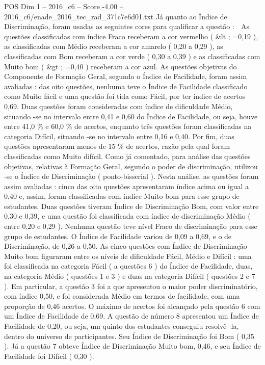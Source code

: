 \begin{textsample}{POS Dim 1 – 2016\_c6 – Score -4.00 – 2016\_c6/enade\_2016\_tec\_rad\_371c7e6d01.txt}
Já quanto ao Índice de Discriminação, foram usadas as seguintes cores para qualificar a questão :  As questões classificadas com índice Fraco receberam a cor vermelho ( \&lt ; =0,19 ), as classificadas com Médio receberam a cor amarelo ( 0,20 a 0,29 ), as classificadas com Bom receberam a cor verde ( 0,30 a 0,39 ) e as classificadas com Muito bom ( \&gt ; =0,40 ) receberam a cor azul.
As questões objetivas do Componente de Formação Geral, segundo o Índice de Facilidade, foram assim avaliadas : das oito questões, nenhuma teve o Índice de Facilidade classificado como Muito fácil e uma questão foi tida como Fácil, por ter índice de acertos 0,69.
Duas questões foram consideradas com índice de dificuldade Médio, situando -se no intervalo entre 0,41 e 0,60 do Índice de Facilidade, ou seja, houve entre 41,0 \% e 60,0 \% de acertos, enquanto três questões foram classificadas na categoria Difícil, situando -se no intervalo entre 0,16 e 0,40.
Por fim, duas questões apresentaram menos de 15 \% de acertos, razão pela qual foram classificadas como Muito difícil.
Como já comentado, para análise das questões objetivas, relativas à Formação Geral, segundo o poder de discriminação, utilizou -se o Índice de Discriminação ( ponto-bisserial ).
Nesta análise, as questões foram assim avaliadas : cinco das oito questões apresentaram índice acima ou igual a 0,40 e, assim, foram classificadas com índice Muito bom para esse grupo de estudantes.
Duas questões tiveram Índice de Discriminação Bom, com valor entre 0,30 e 0,39, e uma questão foi classificada com índice de discriminação Médio ( entre 0,20 e 0,29 ).
Nenhuma questão teve nível Fraco de discriminação para esse grupo de estudantes.
O Índice de Facilidade variou de 0,09 a 0,69, e o de Discriminação, de 0,26 a 0,50.
As cinco questões com Índice de Discriminação Muito bom figuraram entre os níveis de dificuldade Fácil, Médio e Difícil : uma foi classificada na categoria Fácil ( a questões 6 ) do Índice de Facilidade, duas, na categoria Médio ( questões 1 e 3 ) e duas na categoria Difícil ( questões 2 e 7 ).
Em particular, a questão 3 foi a que apresentou o maior poder discriminatório, com índice 0,50, e foi considerada Médio em termos de facilidade, com uma proporção de 0,46 acertos.
O máximo de acertos foi alcançado pela questão 6 com um Índice de Facilidade de 0,69.
A questão de número 8 apresentou um Índice de Facilidade de 0,20, ou seja, um quinto dos estudantes conseguiu resolvê -la, dentro do universo de participantes.
Seu Índice de Discriminação foi Bom ( 0,35 ).
Já a questão 7 obteve Índice de Discriminação Muito bom, 0,46, e seu Índice de Facilidade foi Difícil ( 0,30 ).

\end{textsample}
